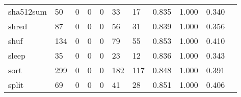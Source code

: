 \begin{longtable}{lp{1.20cm}p{1.20cm}p{1.20cm}p{1.20cm}p{1.20cm}p{1.20cm}p{1.20cm}p{1.20cm}p{1.20cm}p{1.20cm}}
sha512sum &                                    50 &                                                  0 &                                                  0 &                                                  0 &                                                 33 &                                                 17 &                                         0.835 &                                              1.000 &                                              0.340 \\
shred     &                                    87 &                                                  0 &                                                  0 &                                                  0 &                                                 56 &                                                 31 &                                         0.839 &                                              1.000 &                                              0.356 \\
shuf      &                                   134 &                                                  0 &                                                  0 &                                                  0 &                                                 79 &                                                 55 &                                         0.853 &                                              1.000 &                                              0.410 \\
sleep     &                                    35 &                                                  0 &                                                  0 &                                                  0 &                                                 23 &                                                 12 &                                         0.836 &                                              1.000 &                                              0.343 \\
sort      &                                   299 &                                                  0 &                                                  0 &                                                  0 &                                                182 &                                                117 &                                         0.848 &                                              1.000 &                                              0.391 \\
split     &                                    69 &                                                  0 &                                                  0 &                                                  0 &                                                 41 &                                                 28 &                                         0.851 &                                              1.000 &                                              0.406 \\

\end{longtable}
